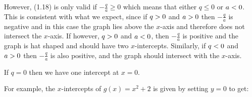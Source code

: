           \label{m39345*id243360}However, (1.18) is only valid if $-\frac{q}{a}\ge 0$ which means that either $q\le 0$ or $a<{}0$. This is consistent with what we expect, since if $q>{}0$ and $a>{}0$ then $-\frac{q}{a}$ is negative and in this case the graph lies above the $x$-axis and therefore does not intersect the $x$-axis. If however, $q>{}0$ and $a<{}0$, then $-\frac{q}{a}$ is positive and the graph is hat shaped and should have two $x$-intercepts. Similarly, if $q<{}0$ and $a>{}0$ then $-\frac{q}{a}$ is also positive, and the graph should intersect with the $x$-axis.\par 
          \label{m39345*id243593}If $q=0$ then we have one intercept at $x=0$.\par 
          \label{m39345*id243626}For example, the $x$-intercepts of $g\left(x\right)={x}^{2}+2$ is given by setting $y=0$ to get:\par 
          \label{m39345*id243687}\nopagebreak\noindent{}
